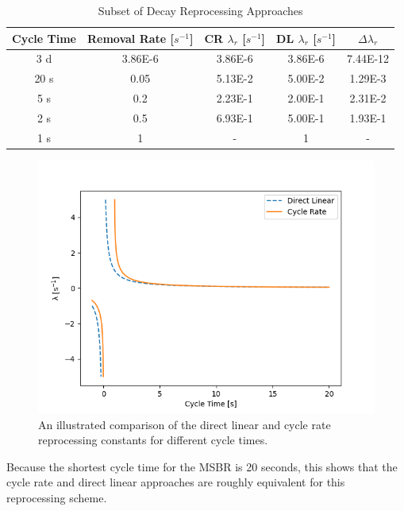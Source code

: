 \begin{table}[H]
\renewcommand{\arraystretch}{1.25}
\caption{Subset of Decay Reprocessing Approaches}
\label{tab:repr_decay_view}
\begin{center}
\begin{tabular}{ c | c | c | c | c }
 \hline
 Cycle Time & Removal Rate [$s^{-1}$] & CR $\lambda_{r}$ [$s^{-1}$] & DL $\lambda_{r}$ [$s^{-1}$] & $\Delta \lambda_{r}$\\
 \hline
 \hline
 3 d & 3.86E-6 & 3.86E-6 & 3.86E-6 & 7.44E-12\\
 20 s & 0.05 & 5.13E-2 & 5.00E-2 & 1.29E-3\\
 5 s & 0.2 & 2.23E-1 & 2.00E-1 & 2.31E-2\\
 2 s & 0.5 & 6.93E-1 & 5.00E-1 & 1.93E-1\\
 1 s & 1 & - & 1 & -\\
 \hline
\end{tabular}
\end{center}
\end{table}

\begin{figure}[H]
  \centering
  \includegraphics[scale=0.7]{images/dl_cr_asymptote.png}
  \caption{An illustrated comparison of the direct linear and cycle rate reprocessing constants for different cycle times.}
   \label{fig:dl_cr_asymptotic}
\end{figure}

Because the shortest cycle time for the MSBR is 20 seconds, this shows that the cycle rate and direct linear approaches are roughly equivalent for this reprocessing scheme.

